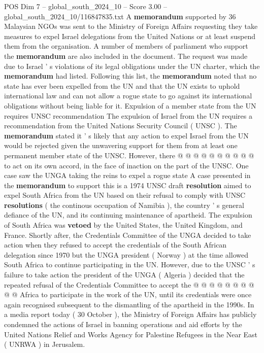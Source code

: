 \begin{textsample}{POS Dim 7 – global\_south\_2024\_10 – Score 3.00 – global\_south\_2024\_10/116847835.txt}  \label{ex:f7_pos_200}
A \textbf{memorandum} supported by 36 Malaysian NGOs was sent to the Ministry of Foreign Affairs requesting they take measures to expel Israel delegations from the United Nations or at least suspend them from the organisation.
A number of members of parliament who support the \textbf{memorandum} are also included in the document.
The request was made due to Israel ' s violations of its legal obligations under the UN charter, which the \textbf{memorandum} had listed.
Following this list, the \textbf{memorandum} noted that no state has ever been expelled from the UN and that the UN exists to uphold international law and can not allow a rogue state to go against its international obligations without being liable for it.
Expulsion of a member state from the UN requires UNSC recommendation The expulsion of Israel from the UN requires a recommendation from the United Nations Security Council ( UNSC ).
The \textbf{memorandum} stated it ' s likely that any action to expel Israel from the UN would be rejected given the unwavering support for them from at least one permanent member state of the UNSC.
However, there @ @ @ @ @ @ @ @ @ @ to act on its own accord, in the face of inaction on the part of the UNSC.
One case saw the UNGA taking the reins to expel a rogue state A case presented in the \textbf{memorandum} to support this is a 1974 UNSC draft \textbf{resolution} aimed to expel South Africa from the UN based on their refusal to comply with UNSC \textbf{resolutions} ( the continous occupation of Namibia ), the country ' s general defiance of the UN, and its continuing maintenance of apartheid.
The expulsion of South Africa was \textbf{vetoed} by the United States, the United Kingdom, and France.
Shortly after, the Credentials Committee of the UNGA decided to take action when they refused to accept the credentials of the South African delegation since 1970 but the UNGA president ( Norway ) at the time allowed South Africa to continue participating in the UN.
However, due to the UNSC ' s failure to take action the president of the UNGA ( Algeria ) decided that the repeated refusal of the Credentials Committee to accept the @ @ @ @ @ @ @ @ @ @ Africa to participate in the work of the UN, until its credentials were once again recognised subsequent to the dismantling of the apartheid in the 1990s.
In a media report today ( 30 October ), the Ministry of Foreign Affairs has publicly condemned the actions of Israel in banning operations and aid efforts by the United Nations Relief and Works Agency for Palestine Refugees in the Near East ( UNRWA ) in Jerusalem.

\end{textsample}
